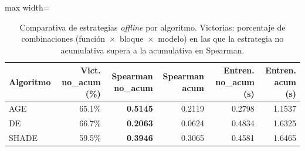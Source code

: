 \begin{table}[H]
    \centering
    \small
    \begin{adjustbox}{max width=\textwidth}
\begin{tabular}{l r r r r r}
\toprule
\textbf{Algoritmo} & \textbf{Vict. no\_acum (\%)} & \textbf{Spearman no\_acum} & \textbf{Spearman acum} & \textbf{Entren. no\_acum (s)} & \textbf{Entren. acum (s)} \\
\midrule
AGE & 65.1\% & \textbf{0.5145} & 0.2119 & 0.2798 & 1.1537 \\
DE & 66.7\% & \textbf{0.2063} & 0.0624 & 0.4834 & 1.6325 \\
SHADE & 59.5\% & \textbf{0.3946} & 0.3065 & 0.4581 & 1.6465 \\
\bottomrule
\end{tabular}
    \end{adjustbox}
    \caption{Comparativa de estrategias \textit{offline} por algoritmo. Victorias: porcentaje de combinaciones (función~$\times$~bloque~$\times$~modelo) en las que la estrategia no acumulativa supera a la acumulativa en Spearman.}
    \label{tab:comparativa_estrategias_offline_v2}
\end{table}